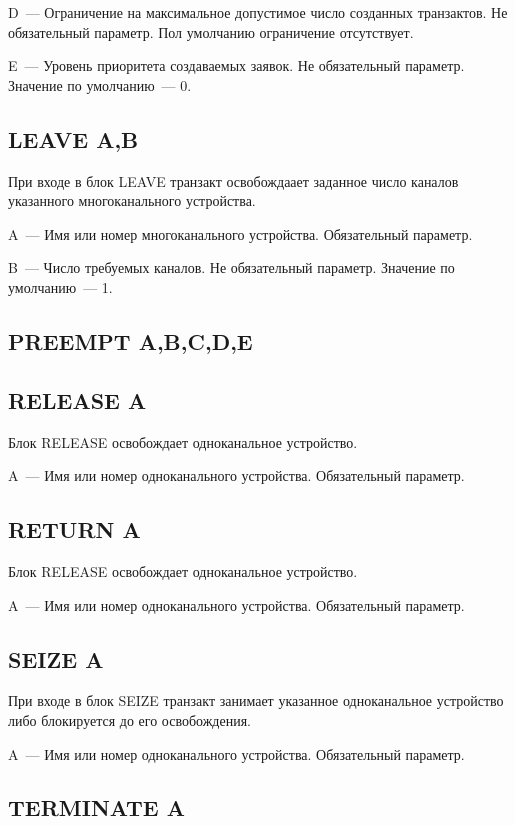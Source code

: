 D~--- Ограничение на максимальное допустимое число созданных транзактов. Не обязательный параметр. Пол умолчанию ограничение отсутствует.

E~--- Уровень приоритета создаваемых заявок. Не обязательный параметр. Значение по умолчанию~--- 0.

\subsection*{LEAVE A,B}

При входе в блок LEAVE транзакт освобождаает заданное число каналов указанного многоканального устройства.

A~--- Имя или номер многоканального устройства. Обязательный параметр.

B~--- Число требуемых каналов. Не обязательный параметр. Значение по умолчанию~--- 1.

\subsection*{PREEMPT A,B,C,D,E}

\subsection*{RELEASE A}

Блок RELEASE освобождает одноканальное устройство.

A~--- Имя или номер одноканального устройства. Обязательный параметр.

\subsection*{RETURN A}

Блок RELEASE освобождает одноканальное устройство.

A~--- Имя или номер одноканального устройства. Обязательный параметр.

\subsection*{SEIZE A}

При входе в блок SEIZE транзакт занимает указанное одноканальное устройство либо блокируется до его освобождения.

A~--- Имя или номер одноканального устройства. Обязательный параметр.

\subsection*{TERMINATE A}

